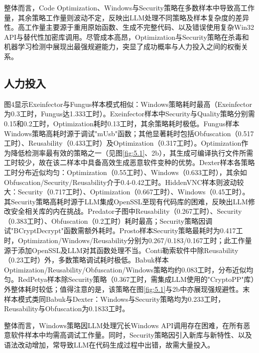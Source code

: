 整体而言，Code Optimization、Windows与Security策略在多数样本中导致高工作量，其余策略工作量则波动不定，反映出LLM处理不同策略及样本复杂度的差异性。高工作量主要源于重用原始函数、生成不完整代码、以及错误使用复杂Win32 API与替代性加密库调用。尽管成本高昂，Optimization与Security策略在杀毒和机器学习检测中展现出最强规避能力，突显了成功概率与人力投入之间的权衡关系。

\subsection{人力投入}
图4显示Exeinfector与Fungus样本模式相似：Windows策略耗时最高（Exeinfector为0.3工时，Fungus达1.333工时）。Exeinfector样本中Security与Quality策略分别需0.15和0.2工时，Optimization耗时0.13工时，其余策略耗时极低。Fungus样本Windows策略高耗时源于调试"mUsb"函数；其他显著耗时包括Obfuscation（0.517工时）、Reusability（0.433工时）及Optimization（0.317工时）。Optimization作为降低检测率最有效的策略之一（见图\ref{fig:5.1}、2b），其生成可编译执行文件所需工时较少，故在该二样本中具备高效生成恶意软件变种的优势。Dexter样本各策略工时分布近似均匀：Optimization（0.55工时）、Windows（0.633工时），其余如Obfuscation/Security/Reusability介于0.4-0.42工时。HiddenVNC样本则波动较大：Security（0.717工时）、Optimization（0.667工时）、Windows（0.45工时）。其Security策略高耗时源于LLM集成OpenSSL至现有代码库的困难，反映出LLM修改安全相关库的内在挑战。Predator子图中Reusability（0.267工时）、Security（0.383工时）、Obfuscation（0.2工时）耗时最高；Security策略因调试"BCryptDecrypt"函数需额外耗时。Prosto样本Security策略最耗时为0.417工时，Optimization/Windows/Reusability分别为0.267/0.183/0.167工时；此工作量源于添加OpenSSL及LLM对其函数处理不当。Conti勒索软件中除Reusability（0.23工时）外，多数策略调试耗时极低。Babuk样本Optimization/Reusability/Obfuscation/Windows策略均约0.083工时，分布近似均匀。RedPetya样本除Security策略（0.367工时，需集成LLM使用的"CryptoPP"库）外整体耗时较低；值得注意的是，该策略在图\ref{fig:5.1}与2b中亦展现强规避性。末样本模式类同Babuk与Dexter：Windows与Security策略均为0.233工时，Reusability与Obfuscation为0.1833工时。

整体而言，Windows策略因LLM处理冗长Windows API调用存在困难，在所有恶意软件样本中均需高调试工作量。同时，Security策略因引入新库与新特性、以及语法改动增加，常导致LLM在代码生成过程中出错，故需大量投入。

